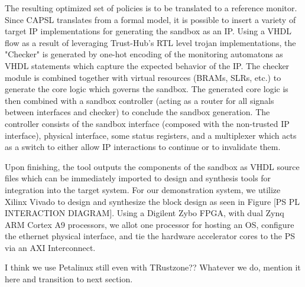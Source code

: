 \documentclass[sigconf]{acmart}
\theoremstyle{plain}
\theoremstyle{remark}
\begin{document}
The resulting optimized set of policies is to be translated to a reference monitor. Since CAPSL translates from a formal model, it is possible to insert a variety of target IP implementations for generating the sandbox as an IP. Using a VHDL flow as a result of leveraging Trust-Hub's RTL level trojan implementations, the "Checker" is generated by one-hot encoding of the monitoring automatons as VHDL statements which capture the expected behavior of the IP. The checker module is combined together with virtual resources (BRAMs, SLRs, etc.) to generate the core logic which governs the sandbox. The generated core logic is then combined with a sandbox controller (acting as a router for all signals between interfaces and checker) to conclude the sandbox generation. The controller consists of the sandbox interface (composed with the non-trusted IP interface), physical interface, some status registers, and a multiplexer which acts as a switch to either allow IP interactions to continue or to invalidate them.


Upon finishing, the tool outputs the components of the sandbox as VHDL source files which can be immediately imported to design and synthesis tools for integration into the target system. For our demonstration system, we utilize Xilinx Vivado to design and synthesize the block design as seen in Figure [PS PL INTERACTION DIAGRAM]. Using a Digilent Zybo FPGA, with dual Zynq ARM Cortex A9 processors, we allot one processor for hosting an OS, configure the ethernet physical interface, and tie the hardware accelerator cores to the PS via an AXI Interconnect.

I think we use Petalinux still even with TRustzone?? Whatever we do, mention it here and transition to next section.
\end{document}

